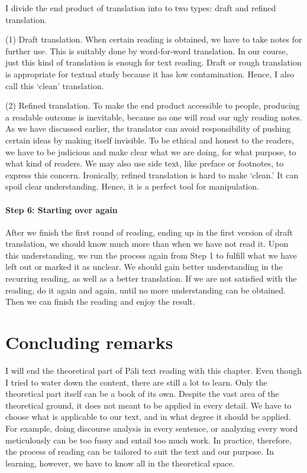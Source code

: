 I divide the end product of translation into to two types: draft and refined translation.

(1) Draft translation. When certain reading is obtained, we have to take notes for further use. This is suitably done by word-for-word translation. In our course, just this kind of translation is enough for text reading. Draft or rough translation is appropriate for textual study because it has low contamination. Hence, I also call this `clean' translation.

(2) Refined translation. To make the end product accessible to people, producing a readable outcome is inevitable, because no one will read our ugly reading notes. As we have discussed earlier, the translator can avoid responsibility of pushing certain ideas by making itself invisible. To be ethical and honest to the readers, we have to be judicious and make clear what we are doing, for what purpose, to what kind of readers. We may also use side text, like preface or footnotes, to express this concern. Ironically, refined translation is hard to make `clean.' It can spoil clear understanding. Hence, it is a perfect tool for manipulation.

\paragraph*{Step 6: Starting over again} After we finish the first round of reading, ending up in the first version of draft translation, we should know much more than when we have not read it. Upon this understanding, we run the process again from Step 1 to fulfill what we have left out or marked it as unclear. We should gain better understanding in the recurring reading, as well as a better translation. If we are not satisfied with the reading, do it again and again, until no more understanding can be obtained. Then we can finish the reading and enjoy the result.

\section*{Concluding remarks}

I will end the theoretical part of P\=ali text reading with this chapter. Even though I tried to water down the content, there are still a lot to learn. Only the theoretical part itself can be a book of its own. Despite the vast area of the theoretical ground, it does not meant to be applied in every detail. We have to choose what is applicable to our text, and in what degree it should be applied. For example, doing discourse analysis in every sentence, or analyzing every word meticulously can be too fussy and entail too much work. In practice, therefore, the process of reading can be tailored to suit the text and our purpose. In learning, however, we have to know all in the theoretical space. 

